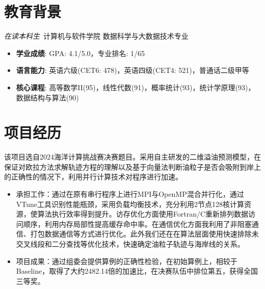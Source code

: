 \documentclass{resume}
\begin{document}



\section{教育背景}
\textit{在读本科生}\ 计算机与软件学院 数据科学与大数据技术专业
\begin{itemize}
  \item \textbf{学业成绩}: GPA: 4.1/5.0，专业排名: 1/65
  \item \textbf{语言能力}: 英语六级(CET6: 478)，英语四级(CET4: 521)，普通话二级甲等
  \item \textbf{核心课程}: 高等数学II(95)，线性代数(91)，概率统计(93)，统计学原理(93)，数据结构与算法(90)
\end{itemize}

\section{项目经历}

该项目选自2024海洋计算挑战赛决赛题目。采用自主研发的二维溢油预测模型，在保证对欧拉方法求解轨迹方程的理解以及基于向量法判断油粒子是否会吸附到岸上的正确性的情况下，利用并行计算技术对程序进行加速。
\begin{itemize}
  \item 承担工作：通过在原有串行程序上进行MPI与OpenMP混合并行化，通过VTune工具识别性能瓶颈，采用负载均衡技术，充分利用2节点128核计算资源，使算法执行效率得到提升。访存优化方面使用Fortran/C重新排列数据访问顺序，利用内存局部性提高缓存命中率。在通信优化方面我利用了非阻塞通信、打包数据通信等方式进行优化。此外我们还在在算法层面使用快速排除未交叉线段和二分查找等优化技术，快速确定油粒子轨迹与海岸线的关系。
  \item 项目成果：通过组委会提供算例的正确性检验，在初始算例上，相较于Baseline，取得了大约2482.14倍的加速比，在决赛队伍中排位第五，获得全国三等奖。
\end{itemize}
\end{document}
